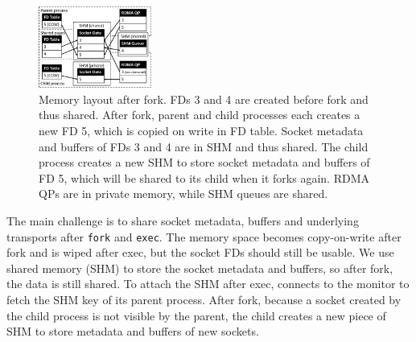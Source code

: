 \begin{figure}[t!]
	\centering
	\includegraphics[width=0.33\textwidth]{images/fork_memory}
	\vspace{-5pt}
	\caption{Memory layout after fork. FDs 3 and 4 are created before fork and thus shared. After fork, parent and child processes each creates a new FD 5, which is copied on write in FD table. Socket metadata and buffers of FDs 3 and 4 are in SHM and thus shared. The child process creates a new SHM to store socket metadata and buffers of FD 5, which will be shared to its child when it forks again. RDMA QPs are in private memory, while SHM queues are shared.}
	\label{fig:fork-memory}
\end{figure}

The main challenge is to share socket metadata, buffers and underlying transports after \texttt{fork} and \texttt{exec}.
The memory space becomes copy-on-write after fork and is wiped after exec, but the socket FDs should still be usable.
We use shared memory (SHM) to store the socket metadata and buffers, so after fork, the data is still shared.
To attach the SHM after exec, \libipc{} connects to the monitor to fetch the SHM key of its parent process.
After fork, because a socket created by the child process is not visible by the parent, the child creates a new piece of SHM to store metadata and buffers of new sockets.

